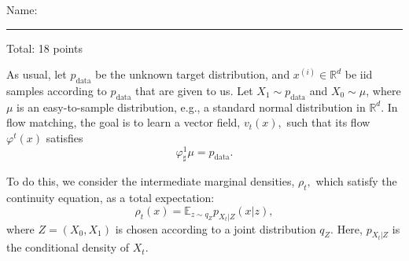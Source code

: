 \documentclass[12pt]{article}
\begin{document}
\begin{center}
Name: \rule{3in}{0.4pt} \hfill Total: 18 points
\end{center}

As usual, let $p_\mathrm{data}$ be the unknown target distribution, and $x^{(i)} \in \mathbb{R}^d$ be iid samples according to $p_\mathrm{data}$ that are given to us.
Let $X_1 \sim p_\mathrm{data}$ and $X_0 \sim \mu$, where $\mu$ is an easy-to-sample distribution, e.g., a standard normal distribution in $\mathbb{R}^d$.
In flow matching, the goal is to learn a vector field, $v_t(x),$ such that its flow $\varphi^t(x)$ satisfies
$$\varphi^1_\sharp \mu = p_\mathrm{data}.$$

To do this, we consider the intermediate marginal densities, $\rho_t,$ which satisfy the continuity equation, as a total expectation:
\begin{equation}
	\rho_t(x) = \mathbb{E}_{z \sim q_Z} p_{X_t|Z}(x|z),
\end{equation}
where $Z = (X_0, X_1)$ is chosen according to a joint distribution $q_Z.$ Here, $p_{X_t|Z}$ is the conditional density of $X_t$.    
\end{document}
